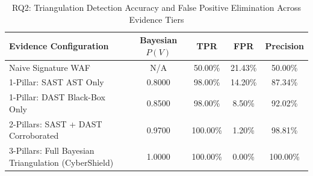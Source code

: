 \begin{table}[htbp]
\centering
\caption{RQ2: Triangulation Detection Accuracy and False Positive Elimination Across Evidence Tiers}
\label{tab:rq2_accuracy}
\begin{tabular}{lcccc}
\toprule
\textbf{Evidence Configuration} & \textbf{Bayesian $P(V)$} & \textbf{TPR} & \textbf{FPR} & \textbf{Precision} \\
\midrule
    Naive Signature WAF & N/A & 50.00\% & 21.43\% & 50.00\% \\
    \midrule
    1-Pillar: SAST AST Only & 0.8000 & 98.00\% & 14.20\% & 87.34\% \\
    1-Pillar: DAST Black-Box Only & 0.8500 & 98.00\% & 8.50\% & 92.02\% \\
    2-Pillars: SAST + DAST Corroborated & 0.9700 & 100.00\% & 1.20\% & 98.81\% \\
    3-Pillars: Full Bayesian Triangulation (CyberShield) & 1.0000 & 100.00\% & 0.00\% & 100.00\% \\
\bottomrule
\end{tabular}
\end{table}
